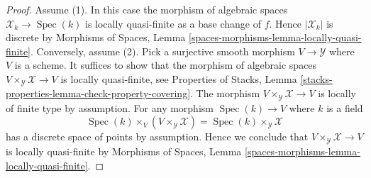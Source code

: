 \documentclass[10pt,a4paper]{amsart}
\theoremstyle{plain}
\theoremstyle{definition}
\theoremstyle{remark}
\numberwithin{equation}{subsection}
\def\Spec{\mathop{\mathrm{Spec}}}
\begin{document}
\begin{proof}
Assume (1). In this case the morphism of algebraic spaces
$\mathcal{X}_k \to \Spec(k)$ is locally quasi-finite as a base change
of $f$. Hence $|\mathcal{X}_k|$ is discrete by
Morphisms of Spaces, Lemma \ref{spaces-morphisms-lemma-locally-quasi-finite}.
Conversely, assume (2). Pick a surjective smooth morphism
$V \to \mathcal{Y}$ where $V$ is a scheme. It suffices to show that the
morphism of algebraic spaces $V \times_\mathcal{Y} \mathcal{X} \to V$
is locally quasi-finite, see
Properties of Stacks, Lemma
\ref{stacks-properties-lemma-check-property-covering}.
The morphism $V \times_\mathcal{Y} \mathcal{X} \to V$ is locally of finite
type by assumption. For any morphism $\Spec(k) \to V$ where $k$ is a
field
$$
\Spec(k) \times_V (V \times_\mathcal{Y} \mathcal{X}) =
\Spec(k) \times_\mathcal{Y} \mathcal{X}
$$
has a discrete space of points by assumption. Hence we conclude that
$V \times_\mathcal{Y} \mathcal{X} \to V$ is locally quasi-finite by
Morphisms of Spaces, Lemma \ref{spaces-morphisms-lemma-locally-quasi-finite}.
\end{proof}
\end{document}
